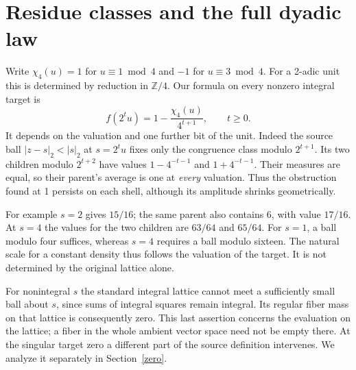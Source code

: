 \documentclass[12pt,letterpaper]{article}
\begin{document}
\clearpage\section{Residue classes and the full dyadic law}
Write \(\chi_4(u)=1\) for \(u\equiv1\bmod4\) and \(-1\) for \(u\equiv3\bmod4\). For a 2-adic unit this is determined by reduction in \(\mathbb Z/4\). Our formula on every nonzero integral target is
\[
 \boxed{\quad f(2^tu)=1-\frac{\chi_4(u)}{4^{t+1}},\qquad t\ge0.\quad}
\]
It depends on the valuation and one further bit of the unit. Indeed the source ball \(|z-s|_2<|s|_2\) at \(s=2^tu\) fixes only the congruence class modulo \(2^{t+1}\). Its two children modulo \(2^{t+2}\) have values \(1-4^{-t-1}\) and \(1+4^{-t-1}\). Their measures are equal, so their parent's average is one at \emph{every} valuation. Thus the obstruction found at 1 persists on each shell, although its amplitude shrinks geometrically.

For example \(s=2\) gives \(15/16\); the same parent also contains \(6\), with value \(17/16\). At \(s=4\) the values for the two children are \(63/64\) and \(65/64\). For \(s=1\), a ball modulo four suffices, whereas \(s=4\) requires a ball modulo sixteen. The natural scale for a constant density thus follows the valuation of the target. It is not determined by the original lattice alone.

For nonintegral \(s\) the standard integral lattice cannot meet a sufficiently small ball about \(s\), since sums of integral squares remain integral. Its regular fiber mass on that lattice is consequently zero. This last assertion concerns the evaluation on the lattice; a fiber in the whole ambient vector space need not be empty there. At the singular target zero a different part of the source definition intervenes. We analyze it separately in Section~\ref{zero}.
\end{document}
